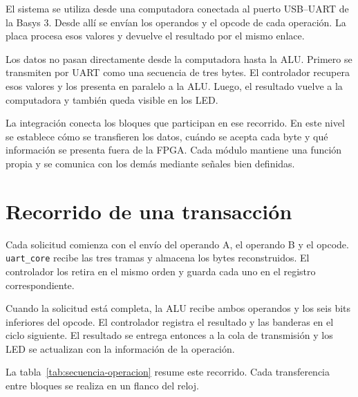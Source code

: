 El sistema se utiliza desde una computadora conectada al puerto
USB--UART de la Basys 3. Desde allí se envían los operandos y el
opcode de cada operación. La placa procesa esos valores y devuelve el
resultado por el mismo enlace.

Los datos no pasan directamente desde la computadora hasta la ALU.
Primero se transmiten por UART como una secuencia de tres bytes. El
controlador recupera esos valores y los presenta en paralelo a la
ALU. Luego, el resultado vuelve a la computadora y también queda
visible en los LED.

La integración conecta los bloques que participan en ese recorrido.
En este nivel se establece cómo se transfieren los datos, cuándo se
acepta cada byte y qué información se presenta fuera de la FPGA. Cada
módulo mantiene una función propia y se comunica con los demás
mediante señales bien definidas.

\section{Recorrido de una transacción}

Cada solicitud comienza con el envío del operando A, el operando B y
el opcode. \texttt{uart\_core} recibe las tres tramas y almacena los
bytes reconstruidos. El controlador los retira en el mismo orden y
guarda cada uno en el registro correspondiente.

Cuando la solicitud está completa, la ALU recibe ambos operandos y
los seis bits inferiores del opcode. El controlador registra el
resultado y las banderas en el ciclo siguiente. El resultado se
entrega entonces a la cola de transmisión y los LED se actualizan con
la información de la operación.

La tabla~\ref{tab:secuencia-operacion} resume este recorrido. Cada
transferencia entre bloques se realiza en un flanco del reloj.

